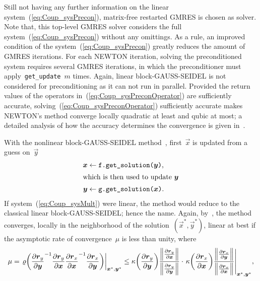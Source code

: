 \documentclass[10pt, ngerman, english,
twoside, open=right,
numbers=noenddot,
declaration=section,
abstract=section,
abstract=multiple,
abstract=notoc,
declaration=notoc,
cd=pale, 
chapterprefix=off, 
chapterpage=false, 
headingsvskip=-10em,
cdgeometry=custom, 
slantedgreek=on,
cdmath=on, 
cdfont=on,
ttfont=false,
mathswap=off,
]{tudscrreprt}
\numberwithin{equation}{chapter}
\renewcommand{\textsc}[1]{\uppercase{\mbox{#1}}}
\newcommand{\sidenote}[1]{
  \leavevmode %
  \marginpar{\hyphenpenalty=1000 \flushleft{\textcolor{HKS41}{#1}}}}
\begin{document}
\begin{itemize}
Still not having any further information on the linear system~(\ref{eq:Coup_sysPrecon}), matrix-free restarted GMRES is chosen as solver. Note that, this top-level GMRES solver considers the full system~(\ref{eq:Coup_sysPrecon}) without any omittings. As a rule, an improved condition of the system~(\ref{eq:Coup_sysPrecon}) greatly reduces the amount of GMRES iterations. 
For each \textsc{Newton} iteration, solving the preconditioned system requires several GMRES iterations, in which the preconditioner must apply~\texttt{get\_update}~$m$ times. 
Again, linear block-\textsc{Gau\ss}-\textsc{Seidel} is not considered for preconditioning as it can not run in parallel. 
Provided the return values of the operators in~(\ref{eq:Coup_sysPreconOperator}) are sufficiently accurate, solving~(\ref{eq:Coup_sysPreconOperator}) sufficiently accurate makes \textsc{Newton}'s method converge locally quadratic at least and qubic at most; a detailed analysis of how the accuracy determines the convergence is given in~\cite{Dembo}.
\end{itemize}
\sidenote{\textsc{Gau\ss}-\textsc{Seidel} Method}With the nonlinear block-\textsc{Gau\ss}-\textsc{Seidel} method~\cite[see][Eq.~7.4.26]{Ortega}, first~$\vec{x}$ is updated from a guess on~$\vec{y}$
\begin{subequations}
\begin{align}
\vec{x} &\gets \texttt{f.get\_solution($\vec{y}$)}\text{,}\\*
\intertext{which is then used to update~$\vec{y}$}
\vec{y} &\gets \texttt{g.get\_solution($\vec{x}$)}\text{.}
\end{align}
\end{subequations}
If system~(\ref{eq:Coup_sysMult}) were linear, the method would reduce to the classical linear block-\textsc{Gau\ss}-\textsc{Seidel}; hence the name. Again, by~\cite[see][Th.~10.3.5]{Ortega}, the method converges, locally in the neighborhood of the solution~$(\vec{x}^*, \vec{y}^*)$, linear at best if the asymptotic rate of convergence~$\mu$ is less than unity, where
\begin{equation}
\mu = \at{\varrho\left( \pdiff{\vec{r}_y}{\vec{y}}^{-1} \pdiff{\vec{r}_y}{\vec{x}} \pdiff{\vec{r}_x}{\vec{x}}^{-1} \pdiff{\vec{r}_x}{\vec{y}} \right)}{\vec{x}^*, \vec{y}^*} \leq \kappa\left( \pdiff{\vec{r}_y}{\vec{y}} \right)\frac{\norm{\pdiff{\vec{r}_y}{\vec{x}}}}{\norm{\pdiff{\vec{r}_y}{\vec{y}}}} \cdot \at{\kappa\left( \pdiff{\vec{r}_x}{\vec{x}} \right)\frac{\norm{\pdiff{\vec{r}_x}{\vec{y}}}}{\norm{\pdiff{\vec{r}_x}{\vec{x}\vphantom{\vec{y}}}}}}{\vec{x}^*, \vec{y}^*}\text{,}\label{eq:Coup_convGS}
\end{equation}
\end{document}
